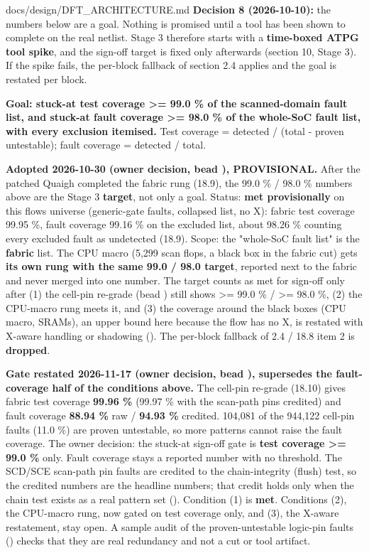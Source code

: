\begin{relocated}{docs/design/DFT_ARCHITECTURE.md}
\textbf{Decision 8 (2026-10-10):} the numbers below are a goal. Nothing
is promised until a tool has been shown to complete on the real netlist.
Stage 3 therefore starts with a \textbf{time-boxed ATPG tool spike}, and
the sign-off target is fixed only afterwards (section 10, Stage 3). If
the spike fails, the per-block fallback of section 2.4 applies and the
goal is restated per block.

\textbf{Goal: stuck-at test coverage \textgreater= 99.0 \% of the
scanned-domain fault list, and stuck-at fault coverage \textgreater=
98.0 \% of the whole-SoC fault list, with every exclusion itemised.}
Test coverage = detected / (total - proven untestable); fault coverage =
detected / total.

\textbf{Adopted 2026-10-30 (owner decision, bead ),
PROVISIONAL.} After the patched Quaigh completed the fabric rung (18.9),
the 99.0 \% / 98.0 \% numbers above are the Stage 3 \textbf{target}, not
only a goal. Status: \textbf{met provisionally} on this
flow\textquotesingle s universe (generic-gate faults, collapsed list, no
X): fabric test coverage 99.95 \%, fault coverage 99.16 \% on the
excluded list, about 98.26 \% counting every excluded fault as
undetected (18.9). Scope: the "whole-SoC fault list" is the
\textbf{fabric} list. The CPU macro (5,299 scan flops, a black box in
the fabric cut) gets \textbf{its own rung with the same 99.0 / 98.0
target}, reported next to the fabric and never merged into one number.
The target counts as met for sign-off only after (1) the cell-pin
re-grade (bead ) still shows \textgreater= 99.0 \% /
\textgreater= 98.0 \%, (2) the CPU-macro rung meets it, and (3) the
coverage around the black boxes (CPU macro, SRAMs), an upper bound here
because the flow has no X, is restated with X-aware handling or
shadowing (). The per-block fallback of 2.4 / 18.8 item 2
is \textbf{dropped}.

\textbf{Gate restated 2026-11-17 (owner decision, bead ),
supersedes the fault-coverage half of the conditions above.} The
cell-pin re-grade (18.10) gives fabric test coverage \textbf{99.96 \%}
(99.97 \% with the scan-path pins credited) and fault coverage
\textbf{88.94 \%} raw / \textbf{94.93 \%} credited. 104,081 of the
944,122 cell-pin faults (11.0 \%) are proven untestable, so more
patterns cannot raise the fault coverage. The owner decision: the
stuck-at sign-off gate is \textbf{test coverage \textgreater= 99.0 \%}
only. Fault coverage stays a reported number with no threshold. The
SCD/SCE scan-path pin faults are credited to the chain-integrity
(flush) test, so the credited numbers are the headline numbers; that
credit holds only when the chain test exists as a real pattern set
(). Condition (1) is \textbf{met}. Conditions (2), the
CPU-macro rung, now gated on test coverage only, and (3), the X-aware
restatement, stay open. A sample audit of the proven-untestable logic-pin
faults () checks that they are real redundancy and not a
cut or tool artifact.


\end{relocated}
